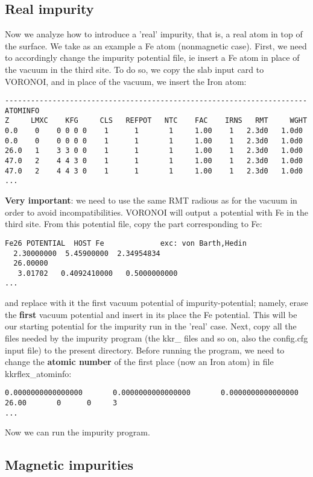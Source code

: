 \documentclass[a4paper,10pt,fullpage]{report}
\begin{document}
\subsection{Real impurity}
\label{sec:real-impurity}

Now we analyze how to introduce a 'real' impurity,
that is, a real atom in top of the surface. 
We take as an example a Fe atom (nonmagnetic case).
First, we need to accordingly change the impurity potential file,
ie insert a Fe atom in place of the vacuum in the third site. 
To do so, we copy the slab input card to VORONOI, and in place
of the vacuum, we insert the Iron atom:
\begin{verbatim}
----------------------------------------------------------------------
ATOMINFO
Z     LMXC    KFG     CLS   REFPOT   NTC    FAC    IRNS   RMT     WGHT
0.0    0    0 0 0 0    1      1       1     1.00    1   2.3d0   1.0d0
0.0    0    0 0 0 0    1      1       1     1.00    1   2.3d0   1.0d0
26.0   1    3 3 0 0    1      1       1     1.00    1   2.3d0   1.0d0
47.0   2    4 4 3 0    1      1       1     1.00    1   2.3d0   1.0d0
47.0   2    4 4 3 0    1      1       1     1.00    1   2.3d0   1.0d0
...
\end{verbatim}
\textbf{Very important}: we need to use the same RMT radious 
as for the vacuum in order to avoid incompatibilities. 
VORONOI will output a potential with Fe in the third site. 
From this potential file, copy the part corresponding to Fe:
\begin{verbatim}
Fe26 POTENTIAL  HOST Fe             exc: von Barth,Hedin
  2.30000000  5.45900000  2.34954834
  26.00000
   3.01702   0.4092410000   0.5000000000
...
\end{verbatim}
and replace with it the first 
vacuum potential of impurity-potential; namely,
erase the \textbf{first} vacuum potential and insert in its
place the Fe potential. 
This will be our starting potential for the impurity run
in the 'real' case. Next, copy all the files needed by the impurity program 
(the kkr\_ files and so on, also the config.cfg input file) to the present directory. 
Before running the program, we need to change the
\textbf{atomic number} of the first place (now an Iron atom) 
in file kkrflex\_atominfo:
\begin{verbatim}
0.0000000000000000       0.0000000000000000       0.0000000000000000 26.00       0      0     3
...
\end{verbatim}
Now we can run the impurity program.

\subsection{Magnetic impurities}
\end{document}

